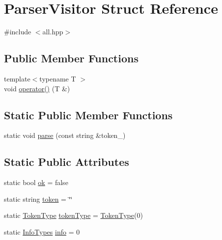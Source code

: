 \hypertarget{struct_parser_visitor}{}\section{Parser\+Visitor Struct Reference}
\label{struct_parser_visitor}


{\ttfamily \#include $<$all.\+hpp$>$}

\subsection*{Public Member Functions}
\begin{DoxyCompactItemize}
\item 
{\footnotesize template$<$typename T $>$ }\\void \hyperlink{struct_parser_visitor_aa5a5df33bf6193a75c72eb2eeb492429}{operator()} (T \&)
\end{DoxyCompactItemize}
\subsection*{Static Public Member Functions}
\begin{DoxyCompactItemize}
\item 
static void \hyperlink{struct_parser_visitor_a1523a32a4a10f8b392ee7fb8b41e6924}{parse} (const string \&token\+\_\+)
\end{DoxyCompactItemize}
\subsection*{Static Public Attributes}
\begin{DoxyCompactItemize}
\item 
static bool \hyperlink{struct_parser_visitor_af5c2d247a1ec646aded499e01ca71553}{ok} = false
\item 
static string \hyperlink{struct_parser_visitor_aab2e2f58eb35027426d9e70f78f20169}{token} = \char`\"{}\char`\"{}
\item 
static \hyperlink{arch_8hpp_aa520fbf142ba1e7e659590c07da31921}{Token\+Type} \hyperlink{struct_parser_visitor_acaa4d8ca1662ec314ae2a8f048f6aca3}{token\+Type} = \hyperlink{arch_8hpp_aa520fbf142ba1e7e659590c07da31921}{Token\+Type}(0)
\item 
static \hyperlink{all_8hpp_a58b4bafc5e94cba5e42b944a85b061db}{Info\+Types} \hyperlink{struct_parser_visitor_a44159efad79cb74d477675367d8dcc3f}{info} = 0
\end{DoxyCompactItemize}



